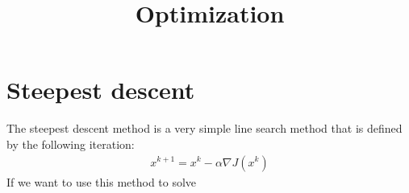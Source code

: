 \documentclass[11pt,a4paper]{article}
\title{Optimization}
\begin{document}
\section{Steepest descent}
The steepest descent method is a very simple line search method that is defined by the following iteration:
\begin{align*}
x^{k+1} = x^k - \alpha\nabla J(x^k)
\end{align*}
If we want to use this method to solve 
\end{document}
